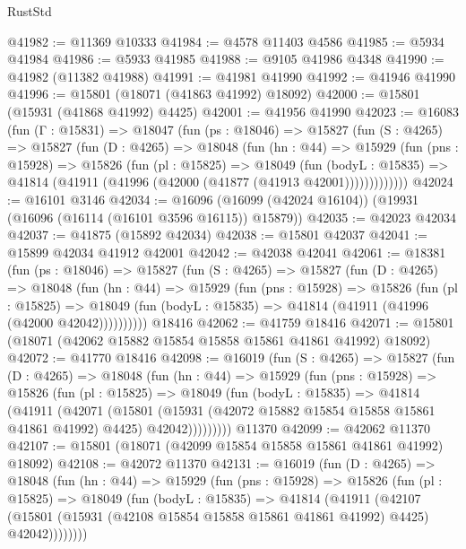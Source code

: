 \begin{lexlean}{RustStd}
\begin{coremodule}
@41982 := @11369 @10333
@41984 := @4578 @11403 @4586
@41985 := @5934 @41984
@41986 := @5933 @41985
@41988 := @9105 @41986 @4348
@41990 := @41982 (@11382 @41988)
@41991 := @41981 @41990
@41992 := @41946 @41990
@41996 := @15801 (@18071 (@41863 @41992) @18092)
@42000 := @15801 (@15931 (@41868 @41992) @4425)
@42001 := @41956 @41990
@42023 := @16083
    (fun (Γ : @15831) =>
    @18047
      (fun (ps : @18046) =>
      @15827
        (fun (S : @4265) =>
        @15827
          (fun (D : @4265) =>
          @18048
            (fun (hn : @44) =>
            @15929
              (fun (pns : @15928) =>
              @15826
                (fun (pl : @15825) =>
                @18049
                  (fun (bodyL : @15835) =>
                  @41814 (@41911 (@41996 (@42000 (@41877 (@41913 @42001)))))))))))))
@42024 := @16101 @3146
@42034 := @16096 (@16099 (@42024 @16104)) (@19931 (@16096 (@16114 (@16101 @3596 @16115)) @15879))
@42035 := @42023 @42034
@42037 := @41875 (@15892 @42034)
@42038 := @15801 @42037
@42041 := @15899 @42034 @41912 @42001
@42042 := @42038 @42041
@42061 := @18381
    (fun (ps : @18046) =>
    @15827
      (fun (S : @4265) =>
      @15827
        (fun (D : @4265) =>
        @18048
          (fun (hn : @44) =>
          @15929
            (fun (pns : @15928) =>
            @15826
              (fun (pl : @15825) =>
              @18049 (fun (bodyL : @15835) => @41814 (@41911 (@41996 (@42000 @42042))))))))))
    @18416
@42062 := @41759 @18416
@42071 := @15801 (@18071 (@42062 @15882 @15854 @15858 @15861 @41861 @41992) @18092)
@42072 := @41770 @18416
@42098 := @16019
    (fun (S : @4265) =>
    @15827
      (fun (D : @4265) =>
      @18048
        (fun (hn : @44) =>
        @15929
          (fun (pns : @15928) =>
          @15826
            (fun (pl : @15825) =>
            @18049
              (fun (bodyL : @15835) =>
              @41814
                (@41911
                  (@42071
                    (@15801
                      (@15931 (@42072 @15882 @15854 @15858 @15861 @41861 @41992) @4425)
                      @42042)))))))))
    @11370
@42099 := @42062 @11370
@42107 := @15801 (@18071 (@42099 @15854 @15858 @15861 @41861 @41992) @18092)
@42108 := @42072 @11370
@42131 := @16019
    (fun (D : @4265) =>
    @18048
      (fun (hn : @44) =>
      @15929
        (fun (pns : @15928) =>
        @15826
          (fun (pl : @15825) =>
          @18049
            (fun (bodyL : @15835) =>
            @41814
              (@41911
                (@42107
                  (@15801 (@15931 (@42108 @15854 @15858 @15861 @41861 @41992) @4425) @42042))))))))

\end{coremodule}
\end{lexlean}
